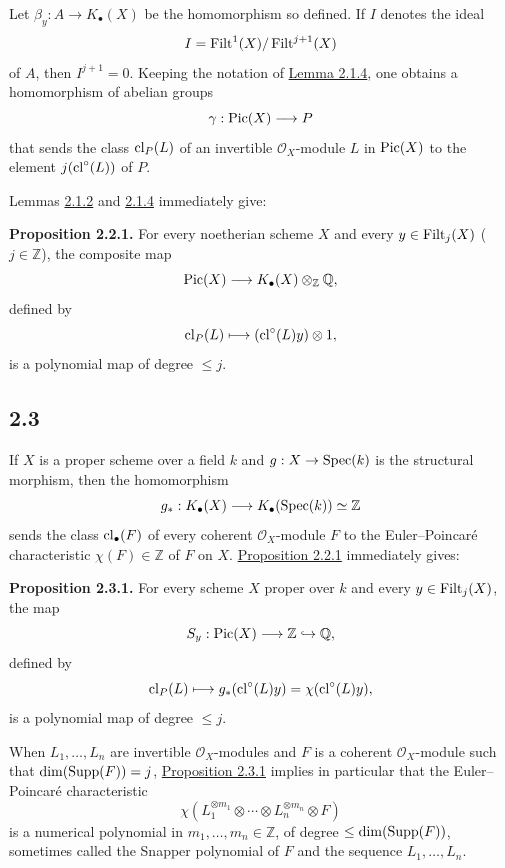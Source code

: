 Let $\beta_y:A\to K_\bullet(X)$ be the homomorphism so defined. If $I$
denotes the ideal
\[
I=\operatorname{Filt}^1(X)/\operatorname{Filt}^{j+1}(X)
\]
of $A$, then $I^{j+1}=0$. Keeping the notation of \hyperlink{sga6.e10.lem.2-1-4}{Lemma 2.1.4}, one obtains a
homomorphism of abelian groups
\[
\gamma:\operatorname{Pic}(X)\longrightarrow P
\]
that sends the class $\operatorname{cl}_P(L)$ of an invertible $\mathcal O_X$-module $L$
in $\operatorname{Pic}(X)$ to the element $j(\operatorname{cl}^\circ(L))$ of $P$.

Lemmas \hyperlink{sga6.e10.lem.2-1-2}{2.1.2} and \hyperlink{sga6.e10.lem.2-1-4}{2.1.4} immediately give:

\textbf{Proposition 2.2.1.}
For every noetherian scheme $X$ and every $y\in\operatorname{Filt}_j(X)$
($j\in\mathbb Z$), the composite map
\[
\operatorname{Pic}(X)\longrightarrow K_\bullet(X)\otimes_{\mathbb Z}\mathbb Q,
\]
defined by
\[
\operatorname{cl}_P(L)\longmapsto(\operatorname{cl}^\circ(L)y)\otimes1,
\]
is a polynomial map of degree $\leq j$.

\subsection*{2.3}
If $X$ is a proper scheme over a field $k$ and
$g:X\to\operatorname{Spec}(k)$ is the structural morphism, then the homomorphism
\[
g_*:K_\bullet(X)\longrightarrow K_\bullet(\operatorname{Spec}(k))\simeq\mathbb Z
\]
sends the class $\operatorname{cl}_\bullet(F)$ of every coherent $\mathcal O_X$-module
$F$ to the Euler--Poincar\'e characteristic $\chi(F)\in\mathbb Z$ of $F$
on $X$. \hyperlink{sga6.e10.prop.2-2-1}{Proposition 2.2.1} immediately gives:

\textbf{Proposition 2.3.1.}
For every scheme $X$ proper over $k$ and every $y\in\operatorname{Filt}_j(X)$, the map
\[
S_y:\operatorname{Pic}(X)\longrightarrow\mathbb Z\hookrightarrow\mathbb Q,
\]
defined by
\[
\operatorname{cl}_P(L)\longmapsto
g_*(\operatorname{cl}^\circ(L)y)=\chi(\operatorname{cl}^\circ(L)y),
\]
is a polynomial map of degree $\leq j$.

When $L_1,\ldots,L_n$ are invertible $\mathcal O_X$-modules and $F$ is a
coherent $\mathcal O_X$-module such that $\dim(\operatorname{Supp}(F))=j$, \hyperlink{sga6.e10.prop.2-3-1}{Proposition
2.3.1} implies in particular that the Euler--Poincar\'e characteristic
\begin{equation}\tag{2.3.2}
\chi(L_1^{\otimes m_1}\otimes\cdots\otimes
L_n^{\otimes m_n}\otimes F)
\end{equation}
is a numerical polynomial in $m_1,\ldots,m_n\in\mathbb Z$, of degree
$\leq\dim(\operatorname{Supp}(F))$, sometimes called the Snapper polynomial of $F$ and
the sequence $L_1,\ldots,L_n$.

